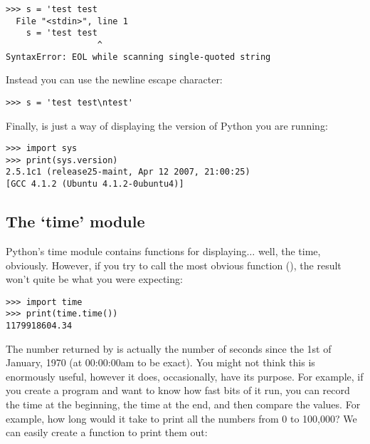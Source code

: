 \begin{listing}
\begin{verbatim}
>>> s = 'test test 
  File "<stdin>", line 1
    s = 'test test 
                  ^
SyntaxError: EOL while scanning single-quoted string
\end{verbatim}
\end{listing}

Instead you can use the newline escape character:
\begin{listing}
\begin{verbatim}
>>> s = 'test test\ntest'
\end{verbatim}
\end{listing}

\noindent
Finally,  is just a way of displaying the version of Python you are running:

\begin{listingignore}
\begin{verbatim}
>>> import sys
>>> print(sys.version)
2.5.1c1 (release25-maint, Apr 12 2007, 21:00:25) 
[GCC 4.1.2 (Ubuntu 4.1.2-0ubuntu4)]
\end{verbatim}
\end{listingignore}

\subsection*{The `time' module}

Python's time module contains functions for displaying$\ldots$ well, the time, obviously. However, if you try to call the most obvious function (), the result won't quite be what you were expecting:

\begin{listingignore}
\begin{verbatim}
>>> import time
>>> print(time.time())
1179918604.34
\end{verbatim}
\end{listingignore}

The number returned by  is actually the number of seconds since the 1st of January, 1970 (at 00:00:00am to be exact). You might not think this is enormously useful, however it does, occasionally, have its purpose. For example, if you create a program and want to know how fast bits of it run, you can record the time at the beginning, the time at the end, and then compare the values. For example, how long would it take to print all the numbers from 0 to 100,000?  We can easily create a function to print them out:

